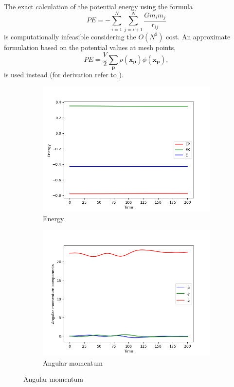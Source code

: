 The exact calculation of the potential energy \cite{taylor2005classical} using the formula
\begin{equation*}
    PE = -\sum_{i=1}^{N}\sum_{j=i+1}^{N}\frac{G m_i m_j}{r_{ij}}
\end{equation*}
is computationally infeasible considering the $O(N^2)$ cost.
An approximate formulation based on the potential values at mesh points,
\begin{equation*}
    PE = \frac{V}{2}\sum_{\mathbf{p}} \rho(\mathbf{x}_\mathbf{p})\phi(\mathbf{x}_\mathbf{p}),
\end{equation*}
is used instead (for derivation refer to \cite{Hockney1988}).
\begin{figure}[htp]
    \centering
    \begin{subfigure}[b]{0.45\textwidth}
        \centering
        \includegraphics[width=\textwidth]{img/pm/energy.png}
        \caption{Energy}
        \label{fig:physical-quantities-pm-sub1}
    \end{subfigure}
    \hfill
    \begin{subfigure}[b]{0.45\textwidth}
        \centering
        \includegraphics[width=\textwidth]{img/pm/angular-momentum.png}
        \caption{Angular momentum}
        \label{fig:physical-quantities-pm-sub2}
    \end{subfigure}


\end{figure}
